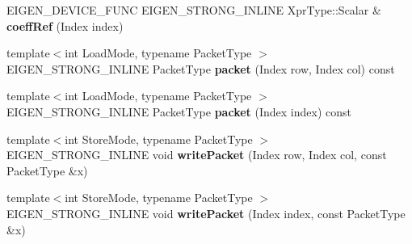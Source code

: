\begin{DoxyCompactItemize}
E\+I\+G\+E\+N\+\_\+\+D\+E\+V\+I\+C\+E\+\_\+\+F\+U\+NC E\+I\+G\+E\+N\+\_\+\+S\+T\+R\+O\+N\+G\+\_\+\+I\+N\+L\+I\+NE Xpr\+Type\+::\+Scalar \& {\bfseries coeff\+Ref} (Index index)
\item 
\mbox{\label{struct_eigen_1_1internal_1_1unary__evaluator_3_01_transpose_3_01_arg_type_01_4_00_01_index_based_01_4_a5e6ff1e2d0a66740648a14daa91633b0}} 
{\footnotesize template$<$int Load\+Mode, typename Packet\+Type $>$ }\\E\+I\+G\+E\+N\+\_\+\+S\+T\+R\+O\+N\+G\+\_\+\+I\+N\+L\+I\+NE Packet\+Type {\bfseries packet} (Index row, Index col) const
\item 
\mbox{\label{struct_eigen_1_1internal_1_1unary__evaluator_3_01_transpose_3_01_arg_type_01_4_00_01_index_based_01_4_ab37d65daf774d2a04f2931f493e1c95a}} 
{\footnotesize template$<$int Load\+Mode, typename Packet\+Type $>$ }\\E\+I\+G\+E\+N\+\_\+\+S\+T\+R\+O\+N\+G\+\_\+\+I\+N\+L\+I\+NE Packet\+Type {\bfseries packet} (Index index) const
\item 
\mbox{\label{struct_eigen_1_1internal_1_1unary__evaluator_3_01_transpose_3_01_arg_type_01_4_00_01_index_based_01_4_a5f656ac6134b2a6d3d617ee4545b3bbb}} 
{\footnotesize template$<$int Store\+Mode, typename Packet\+Type $>$ }\\E\+I\+G\+E\+N\+\_\+\+S\+T\+R\+O\+N\+G\+\_\+\+I\+N\+L\+I\+NE void {\bfseries write\+Packet} (Index row, Index col, const Packet\+Type \&x)
\item 
\mbox{\label{struct_eigen_1_1internal_1_1unary__evaluator_3_01_transpose_3_01_arg_type_01_4_00_01_index_based_01_4_a5850cde3386d111a5d4dd20a8b5cf27c}} 
{\footnotesize template$<$int Store\+Mode, typename Packet\+Type $>$ }\\E\+I\+G\+E\+N\+\_\+\+S\+T\+R\+O\+N\+G\+\_\+\+I\+N\+L\+I\+NE void {\bfseries write\+Packet} (Index index, const Packet\+Type \&x)
\end{DoxyCompactItemize}
